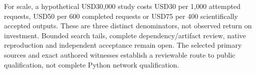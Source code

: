 For scale, a hypothetical USD30,000 study costs USD30 per 1,000 attempted requests, USD50 per 600 completed requests or USD75 per 400 scientifically accepted outputs. These are three distinct denominators, not observed return on investment. Bounded search tails, complete dependency/artifact review, native reproduction and independent acceptance remain open. The selected primary sources and exact authored witnesses establish a reviewable route to public qualification, not complete Python network qualification.~\citep{exec25_pnet_choice}
